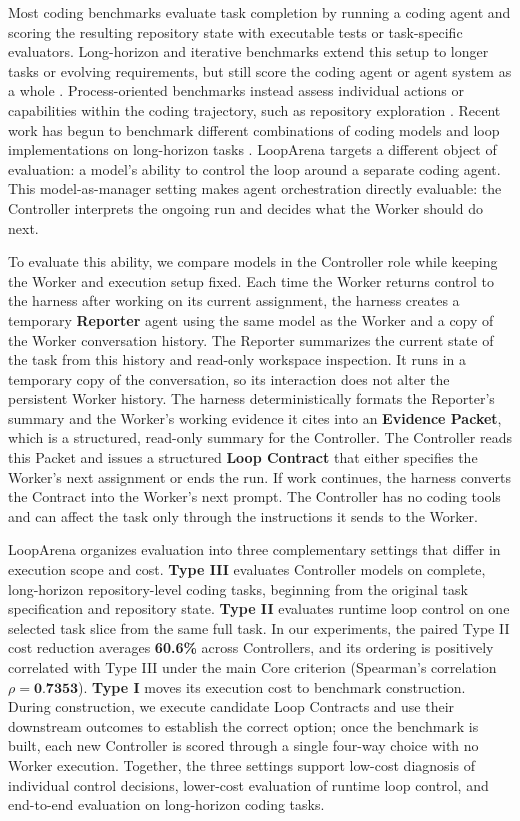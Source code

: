 Most coding benchmarks \citep{Jimenez2023,MultiSWEBench2025} evaluate task completion by running a coding agent and scoring the resulting repository state with executable tests or task-specific evaluators.
Long-horizon and iterative benchmarks extend this setup to longer tasks or evolving requirements, but still score the coding agent or agent system as a whole \citep{SlopCodeBench}.
Process-oriented benchmarks instead assess individual actions or capabilities within the coding trajectory, such as repository exploration \citep{AgentProcessBench2026,SWEExplore2026}.
Recent work has begun to benchmark different combinations of coding models and loop implementations on long-horizon tasks \citep{LoopsBench2026}.
LoopArena targets a different object of evaluation: a model's ability to control the loop around a separate coding agent.
This model-as-manager setting makes agent orchestration directly evaluable: the Controller interprets the ongoing run and decides what the Worker should do next.

To evaluate this ability, we compare models in the Controller role while keeping the Worker and execution setup fixed. Each time the Worker returns control to the harness after working on its current assignment, the harness creates a temporary \textbf{Reporter} agent using the same model as the Worker and a copy of the Worker conversation history. The Reporter summarizes the current state of the task from this history and read-only workspace inspection. It runs in a temporary copy of the conversation, so its interaction does not alter the persistent Worker history. The harness deterministically formats the Reporter's summary and the Worker's working evidence it cites into an \textbf{Evidence Packet}, which is a structured, read-only summary for the Controller. The Controller reads this Packet and issues a structured \textbf{Loop Contract} that either specifies the Worker's next assignment or ends the run. If work continues, the harness converts the Contract into the Worker's next prompt. The Controller has no coding tools and can affect the task only through the instructions it sends to the Worker.

LoopArena organizes evaluation into three complementary settings that differ in execution scope and cost. \textbf{Type III} evaluates Controller models on complete, long-horizon repository-level coding tasks, beginning from the original task specification and repository state. \textbf{Type II} evaluates runtime loop control on one selected task slice from the same full task. In our experiments, the paired Type II cost reduction averages \textbf{60.6\%} across Controllers, and its ordering is positively correlated with Type III under the main Core criterion (Spearman's correlation \(\rho=\textbf{0.7353}\)). \textbf{Type I} moves its execution cost to benchmark construction. During construction, we execute candidate Loop Contracts and use their downstream outcomes to establish the correct option; once the benchmark is built, each new Controller is scored through a single four-way choice with no Worker execution. Together, the three settings support low-cost diagnosis of individual control decisions, lower-cost evaluation of runtime loop control, and end-to-end evaluation on long-horizon coding tasks.

